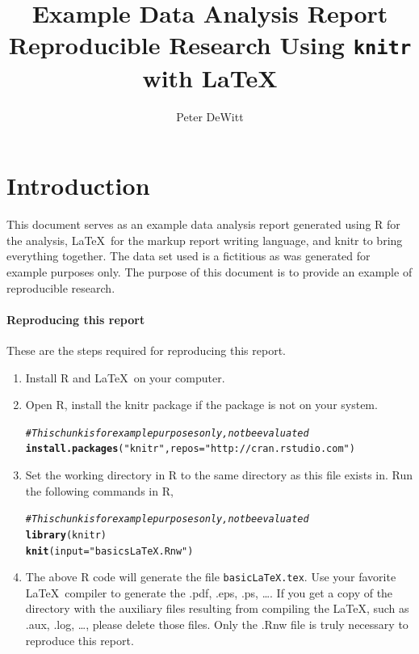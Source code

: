 \documentclass[letterpaper, 10pt]{article}\usepackage[]{graphicx}\usepackage[]{color}
\title{Example Data Analysis Report\\Reproducible Research Using {\tt knitr}
with \LaTeX}
\author{Peter DeWitt}
\makeatletter
\newcommand{\hlstr}[1]{\textcolor[rgb]{0.192,0.494,0.8}{#1}}%
\newcommand{\hlcom}[1]{\textcolor[rgb]{0.678,0.584,0.686}{\textit{#1}}}%
\newcommand{\hlstd}[1]{\textcolor[rgb]{0.345,0.345,0.345}{#1}}%
\newcommand{\hlkwc}[1]{\textcolor[rgb]{0.333,0.667,0.333}{#1}}%
\newcommand{\hlkwd}[1]{\textcolor[rgb]{0.737,0.353,0.396}{\textbf{#1}}}%
\newenvironment{kframe}{%
 \def\at@end@of@kframe{}%
 \ifinner\ifhmode%
  \def\at@end@of@kframe{\end{minipage}}%
  \begin{minipage}{\columnwidth}%
 \fi\fi%
 \def\FrameCommand##1{\hskip\@totalleftmargin \hskip-\fboxsep
 \colorbox{shadecolor}{##1}\hskip-\fboxsep
     \hskip-\linewidth \hskip-\@totalleftmargin \hskip\columnwidth}%
 \MakeFramed {\advance\hsize-\width
   \@totalleftmargin\z@ \linewidth\hsize
   \@setminipage}}%
 {\par\unskip\endMakeFramed%
 \at@end@of@kframe}
\newenvironment{knitrout}{}{} %
\makeatother
\begin{document}
\maketitle

\section{Introduction \label{sec:introduction}}  %

This document serves as an example data analysis report generated using R for
the analysis, \LaTeX\ for the markup report writing language, and knitr to bring
everything together.   The data set used is a fictitious as was generated for
example purposes only.  The purpose of this document is to provide an example of
reproducible research.

\paragraph{Reproducing this report}  These are the steps required for
reproducing this report.
\begin{enumerate}
  \item Install R and \LaTeX\ on your computer.

  \item Open R, install the knitr package if the package is not on your system.
\begin{knitrout}
\color{fgcolor}\begin{kframe}
\begin{alltt}
\hlcom{# This chunk is for example purposes only, not be evaluated}
\hlkwd{install.packages}\hlstd{(}\hlstr{"knitr"}\hlstd{,} \hlkwc{repos} \hlstd{=} \hlstr{"http://cran.rstudio.com"}\hlstd{)}
\end{alltt}
\end{kframe}
\end{knitrout}


  \item Set the working directory in R to the same directory as this file exists
    in.  Run the following commands in R, 
\begin{knitrout}
\color{fgcolor}\begin{kframe}
\begin{alltt}
\hlcom{# This chunk is for example purposes only, not be evaluated}
\hlkwd{library}\hlstd{(knitr)}
\hlkwd{knit}\hlstd{(}\hlkwc{input} \hlstd{=} \hlstr{"basicsLaTeX.Rnw"}\hlstd{)}
\end{alltt}
\end{kframe}
\end{knitrout}


  \item The above R code will generate the file {\tt basicLaTeX.tex}.  Use your
    favorite \LaTeX\ compiler to generate the .pdf, .eps, .ps, \ldots.  If you
    get a copy of the directory with the auxiliary files resulting from compiling
    the \LaTeX, such as .aux, .log, \ldots, please delete those files.  Only the
    .Rnw file is truly necessary to reproduce this report.
\end{enumerate}
\end{document}
